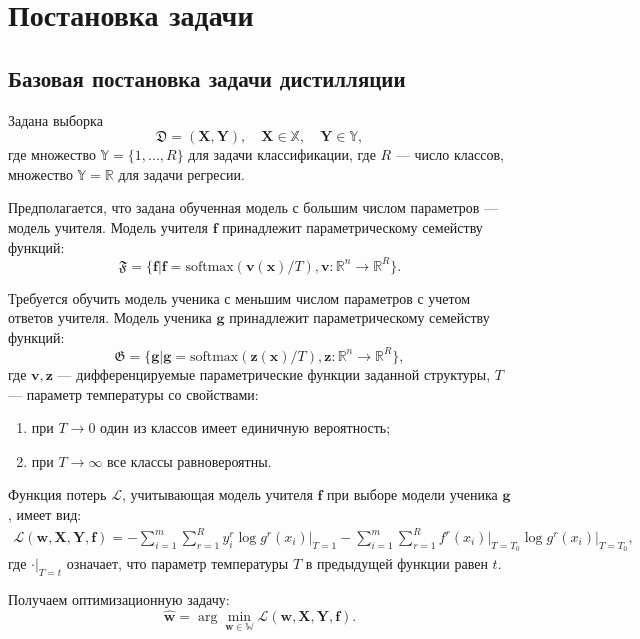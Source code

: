 \newpage

\section{Постановка задачи}

\subsection{Базовая постановка задачи дистилляции}

Задана выборка 
$$\mathfrak{D}=(\mathbf{X},\mathbf{Y}), \quad \mathbf{X} \in \mathbb{X},
\quad \mathbf{Y} \in \mathbb{Y},$$
где множество $\mathbb{Y}=\{1,...,R\}$ для задачи классификации, где $R$ --- число классов, множество $\mathbb{Y}=\mathbb{R}$ для задачи регресии.

Предполагается, что задана обученная модель с большим числом параметров --- модель учителя. Модель учителя $\mathbf{f}$ принадлежит параметрическому семейству функций: $$\mathfrak{F}=\{\mathbf{f}|\mathbf{f}=\text{softmax}(\mathbf{v(x)}/T), \mathbf{v}:\mathbb{R}^{n}\rightarrow \mathbb{R}^{R}\}.$$

Требуется обучить модель ученика с меньшим числом параметров с учетом ответов учителя. Модель ученика $\mathbf{g}$ принадлежит параметрическому семейству функций: $$\mathfrak{G}=\{\mathbf{g}|\mathbf{g}=\text{softmax}(\mathbf{z(x)}/T), \mathbf{z}:\mathbb{R}^{n}\rightarrow \mathbb{R}^{R}\},$$
где $\mathbf{v, z}$ --- дифференцируемые параметрические функции заданной структуры, $T$ --- параметр температуры со свойствами:
\begin{enumerate}
    \item при $T \rightarrow 0$ один из классов имеет единичную вероятность;
    \item при $T \rightarrow \infty$ все классы равновероятны.
\end{enumerate}

Функция потерь $\mathcal{L}$, учитывающая модель учителя $\mathbf{f}$ при выборе модели ученика $\mathbf{g}$, имеет вид:
\[
\begin{aligned}
    \mathcal{L}(\mathbf{w,X,Y,f})=-\sum\limits_{i=1}^{m}\sum\limits_{r=1}^{R}y_{i}^{r}\log{g^{r}(x_{i})}\bigr|_{T=1}-\sum\limits_{i=1}^{m}\sum\limits_{r=1}^{R}f^{r}(x_{i})\bigr|_{T=T_{0}}\log{g^{r}(x_{i})}\bigr|_{T=T_{0}},
\end{aligned}
\]
где $\cdot\bigr|_{T=t}$ означает, что параметр температуры $T$ в предыдущей функции равен $t$.

Получаем оптимизационную задачу:
$$\hat{\mathbf{w}} = \arg\min_{\mathbf{w} \in \mathbb{W}} \mathcal{L}(\mathbf{w,X,Y,f}).$$


